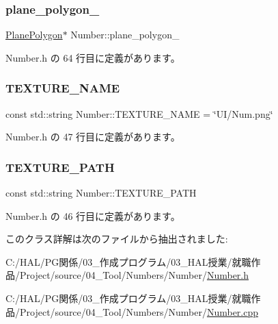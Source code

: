 \subsubsection{\texorpdfstring{plane\+\_\+polygon\+\_\+}{plane\_polygon\_}}
{\footnotesize\ttfamily \mbox{\hyperlink{class_plane_polygon}{Plane\+Polygon}}$\ast$ Number\+::plane\+\_\+polygon\+\_\+}



 Number.\+h の 64 行目に定義があります。

\mbox{\label{class_number_a43c6583cef6d8d32b8de6683f80bdb59}} 
\subsubsection{\texorpdfstring{T\+E\+X\+T\+U\+R\+E\+\_\+\+N\+A\+ME}{TEXTURE\_NAME}}
{\footnotesize\ttfamily const std\+::string Number\+::\+T\+E\+X\+T\+U\+R\+E\+\_\+\+N\+A\+ME = \char`\"{}UI/Num.\+png\char`\"{}\hspace{0.3cm}{\ttfamily [static]}}



 Number.\+h の 47 行目に定義があります。

\mbox{\label{class_number_a0018ed63d70f4dde3c64bf99df7978ce}} 
\subsubsection{\texorpdfstring{T\+E\+X\+T\+U\+R\+E\+\_\+\+P\+A\+TH}{TEXTURE\_PATH}}
{\footnotesize\ttfamily const std\+::string Number\+::\+T\+E\+X\+T\+U\+R\+E\+\_\+\+P\+A\+TH\hspace{0.3cm}{\ttfamily [static]}}



 Number.\+h の 46 行目に定義があります。



このクラス詳解は次のファイルから抽出されました\+:\begin{DoxyCompactItemize}
\item 
C\+:/\+H\+A\+L/\+P\+G関係/03\+\_\+作成プログラム/03\+\_\+\+H\+A\+L授業/就職作品/\+Project/source/04\+\_\+\+Tool/\+Numbers/\+Number/\mbox{\hyperlink{_number_8h}{Number.\+h}}\item 
C\+:/\+H\+A\+L/\+P\+G関係/03\+\_\+作成プログラム/03\+\_\+\+H\+A\+L授業/就職作品/\+Project/source/04\+\_\+\+Tool/\+Numbers/\+Number/\mbox{\hyperlink{_number_8cpp}{Number.\+cpp}}\end{DoxyCompactItemize}
